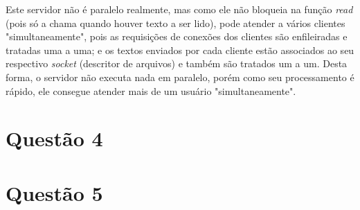 \documentclass[a4paper,10pt]{article}
\begin{document}
Este servidor não é paralelo realmente, mas como ele não bloqueia na função \textit{read} (pois só a chama quando houver texto a ser lido), pode atender a vários clientes "simultaneamente", pois as requisições de conexões dos clientes são enfileiradas e tratadas uma a uma; e os textos enviados por cada cliente estão associados ao seu respectivo \textit{socket} (descritor de arquivos) e também são tratados um a um. Desta forma, o servidor não executa nada em paralelo, porém como seu processamento é rápido, ele consegue atender mais de um usuário "simultaneamente".

\section{Questão 4}

\section{Questão 5}
\end{document}
